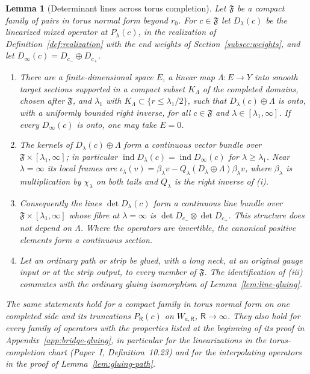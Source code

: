 \documentclass[11pt]{amsart}
\newtheorem{lemma}[theorem]{Lemma}
\theoremstyle{definition}
\theoremstyle{remark}
\theoremstyle{plain}
\numberwithin{equation}{section}
\newcommand{\ind}{\operatorname{ind}}
\begin{document}
\begin{lemma}[Determinant lines across torus completion]
\label{lem:bridge-gluing}
Let $\mathfrak F$ be a compact family of pairs in torus normal form
beyond $r_0$. For $c\in\mathfrak F$ let $D_\lambda(c)$ be the linearized
mixed operator at $P_\lambda(c)$, in the realization of
Definition~\ref{def:realization} with the end weights of
Section~\ref{subsec:weights}, and let $D_\infty(c)=D_{c_-}\oplus D_{c_+}$.
\begin{enumerate}[label=(\roman*)]
\item There are a finite-dimensional space $E$, a linear map
$\Lambda:E\to Y$ into smooth target sections supported in a compact
subset $K_\Lambda$ of the completed domains, chosen after $\mathfrak F$,
and $\lambda_1$ with $K_\Lambda\subset\{r\le\lambda_1/2\}$, such that
$D_\lambda(c)\oplus\Lambda$ is onto, with a uniformly bounded right
inverse, for all $c\in\mathfrak F$ and $\lambda\in[\lambda_1,\infty]$.
If every $D_\infty(c)$ is onto, one may take $E=0$.
\item The kernels of $D_\lambda(c)\oplus\Lambda$ form a continuous vector
bundle over $\mathfrak F\times[\lambda_1,\infty]$; in particular
$\ind D_\lambda(c)=\ind D_\infty(c)$ for $\lambda\ge\lambda_1$. Near $\lambda=\infty$ its
local frames are $\iota_\lambda(v)=\beta_\lambda v-Q_\lambda(D_\lambda\oplus
\Lambda)\beta_\lambda v$, where $\beta_\lambda$ is multiplication by
$\chi_\lambda$ on both tails and $Q_\lambda$ is the right inverse of (i).
\item Consequently the lines $\det D_\lambda(c)$ form a continuous line
bundle over $\mathfrak F\times[\lambda_1,\infty]$ whose fibre at $\lambda=\infty$
is $\det D_{c_-}\otimes\det D_{c_+}$. This structure does not depend on
$\Lambda$. Where the operators are invertible, the canonical positive
elements form a continuous section.
\item Let an ordinary path or strip be glued, with a long neck, at an
original gauge input or at the strip output, to every member of
$\mathfrak F$. The identification of (iii) commutes with the ordinary
gluing isomorphism of Lemma~\ref{lem:line-gluing}.
\end{enumerate}
The same statements hold for a compact family in torus normal form on
one completed side and its truncations $P_{\mathsf R}(c)$ on
$W_{a,\mathsf R}$, $\mathsf R\to\infty$. They also hold for every family of
operators with the properties listed at the beginning of its proof in
Appendix~\ref{app:bridge-gluing}, in
particular for the linearizations in the torus-completion chart (Paper~I,
Definition~10.23) and for the interpolating operators in the proof of
Lemma~\ref{lem:gluing-path}.
\end{lemma}
\end{document}
